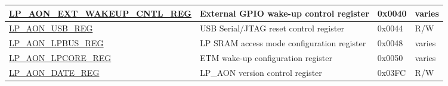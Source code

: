 \begin{longtable}{ | L{8cm} | L{6cm} | l | L{1.2cm} | }
\hyperref[regdesc:LPAONEXTWAKEUPCNTLREG]{LP\_AON\_EXT\_WAKEUP\_CNTL\_REG} & External GPIO wake-up control register & 0x0040 & varies \\ \hline
\hyperref[regdesc:LPAONUSBREG]{LP\_AON\_USB\_REG} & USB Serial/JTAG reset control register & 0x0044 & R/W \\ \hline
\hyperref[regdesc:LPAONLPBUSREG]{LP\_AON\_LPBUS\_REG} & LP SRAM access mode configuration register & 0x0048 & varies \\ \hline
\hyperref[regdesc:LPAONLPCOREREG]{LP\_AON\_LPCORE\_REG} & ETM wake-up configuration register & 0x0050 & varies \\ \hline
\hyperref[regdesc:LPAONDATEREG]{LP\_AON\_DATE\_REG} & LP\_AON version control register & 0x03FC & R/W \\ \hline
\end{longtable}
